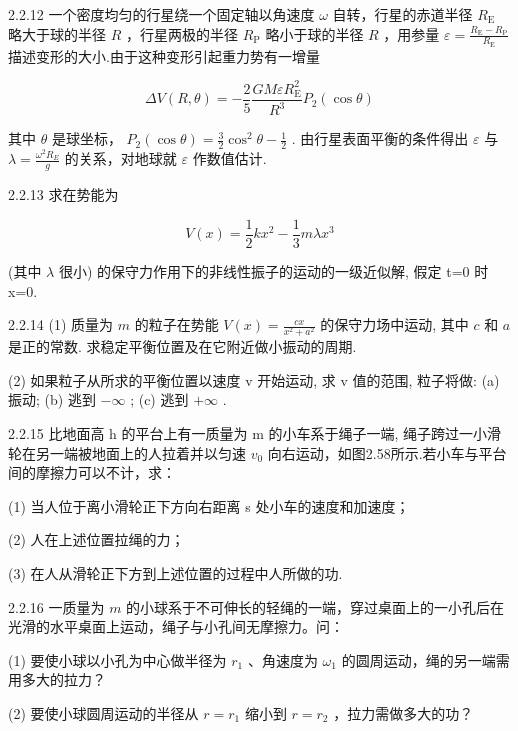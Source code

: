\begin{problem}{2.2.12}
一个密度均匀的行星绕一个固定轴以角速度 $\omega$ 自转，行星的赤道半径 $R_{\mathrm{E}}$ 略大于球的半径 $R$ ，行星两极的半径 $R_{\mathrm{P}}$ 略小于球的半径 $R$ ，用参量 $\varepsilon = \frac{R_{\mathrm{E}} - R_{\mathrm{P}}}{R_{\mathrm{E}}}$ 描述变形的大小.由于这种变形引起重力势有一增量

\[
\Delta V (R, \theta) = - \frac {2}{5} \frac {G M \varepsilon R _ {\mathrm{E}} ^ {2}}{R ^ {3}} P _ {2} (\cos \theta)
\]

其中 $\theta$ 是球坐标， $P_{2}(\cos \theta) = \frac{3}{2}\cos^{2}\theta - \frac{1}{2}$ . 由行星表面平衡的条件得出 $\varepsilon$ 与 $\lambda = \frac{\omega^2 R_E}{g}$ 的关系，对地球就 $\varepsilon$ 作数值估计.
\end{problem}
\clearpage


\begin{problem}{2.2.13}
求在势能为

\[
V (x) = \frac {1}{2} k x ^ {2} - \frac {1}{3} m \lambda x ^ {3}
\]

(其中 $\lambda$ 很小) 的保守力作用下的非线性振子的运动的一级近似解, 假定 t=0 时 x=0.
\end{problem}
\clearpage


\begin{problem}{2.2.14}
(1) 质量为 $m$ 的粒子在势能 $V(x) = \frac{cx}{x^2 + a^2}$ 的保守力场中运动, 其中 $c$ 和 $a$ 是正的常数. 求稳定平衡位置及在它附近做小振动的周期.

(2) 如果粒子从所求的平衡位置以速度 v 开始运动, 求 v 值的范围, 粒子将做: (a) 振动; (b) 逃到 $-\infty$ ; (c) 逃到 $+\infty$ .
\end{problem}
\clearpage


\begin{problem}{2.2.15}
比地面高 h 的平台上有一质量为 m 的小车系于绳子一端, 绳子跨过一小滑轮在另一端被地面上的人拉着并以匀速 $v_{0}$ 向右运动，如图2.58所示.若小车与平台间的摩擦力可以不计，求：

(1) 当人位于离小滑轮正下方向右距离 s 处小车的速度和加速度；

(2) 人在上述位置拉绳的力；

(3) 在人从滑轮正下方到上述位置的过程中人所做的功.
\begin{center}

\end{center}
\end{problem}
\clearpage


\begin{problem}{2.2.16}
一质量为 $m$ 的小球系于不可伸长的轻绳的一端，穿过桌面上的一小孔后在光滑的水平桌面上运动，绳子与小孔间无摩擦力。问：

(1) 要使小球以小孔为中心做半径为 $r_{1}$ 、角速度为 $\omega_{1}$ 的圆周运动，绳的另一端需用多大的拉力？

(2) 要使小球圆周运动的半径从 $r=r_{1}$ 缩小到 $r=r_{2}$ ，拉力需做多大的功？
\end{problem}
\clearpage


